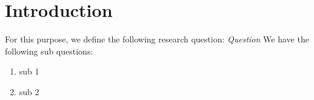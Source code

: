 \section{Introduction}
\label{sec:introduction}


For this purpose, we define the following research question:
\textit{Question}
We have the following sub questions:
\begin{enumerate}
    \item sub 1
    \item sub 2
\end{enumerate}
